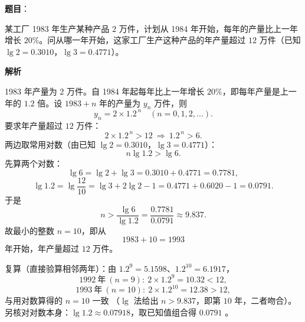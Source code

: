 \begin{answer}

\textbf{题目}：

某工厂 1983 年生产某种产品 $2$ 万件，计划从 1984 年开始，每年的产量比上一年增长 $20\%$。问从哪一年开始，这家工厂生产这种产品的年产量超过 $12$ 万件（已知 $\lg 2=0.3010$，$\lg 3=0.4771$）。

\textbf{解析}

1983 年产量为 $2$ 万件。自 1984 年起每年比上一年增长 $20\%$，即每年产量是上一年的 $1.2$ 倍。设 $1983+n$ 年的产量为 $y_n$ 万件，则
\nopagebreak[4]
\[
y_n=2\times1.2^{\,n}\quad(n=0,1,2,\dots).
\]
要求年产量超过 $12$ 万件：
\nopagebreak[4]
\[
2\times1.2^{\,n}>12\ \Longrightarrow\ 1.2^{\,n}>6.
\]
两边取常用对数（由已知 $\lg2=0.3010$，$\lg3=0.4771$）：
\nopagebreak[4]
\[
n\lg1.2>\lg6.
\]
先算两个对数：
\nopagebreak[4]
\[
\lg6=\lg2+\lg3=0.3010+0.4771=0.7781,
\]
\nopagebreak[4]
\[
\lg1.2=\lg\frac{12}{10}=\lg3+2\lg2-1=0.4771+0.6020-1=0.0791.
\]
于是
\nopagebreak[4]
\[
n>\frac{\lg6}{\lg1.2}=\frac{0.7781}{0.0791}\approx9.837.
\]
故最小的整数 $n=10$，即从
\nopagebreak[4]
\[
1983+10=1993
\]
年开始，年产量超过 $12$ 万件。

复算（直接验算相邻两年）：由 $1.2^9=5.1598$、$1.2^{10}=6.1917$，
\nopagebreak[4]
\[
1992\ \text{年}\ (n=9):\ 2\times1.2^9=10.32<12,
\]
\nopagebreak[4]
\[
1993\ \text{年}\ (n=10):\ 2\times1.2^{10}=12.38>12,
\]
与用对数算得的 $n=10$ 一致 （$\lg$ 法给出 $n>9.837$，即第 $10$ 年，二者吻合）。另核对对数本身：$\lg1.2\approx0.07918$，取已知值组合得 $0.0791$ 。


\end{answer}
